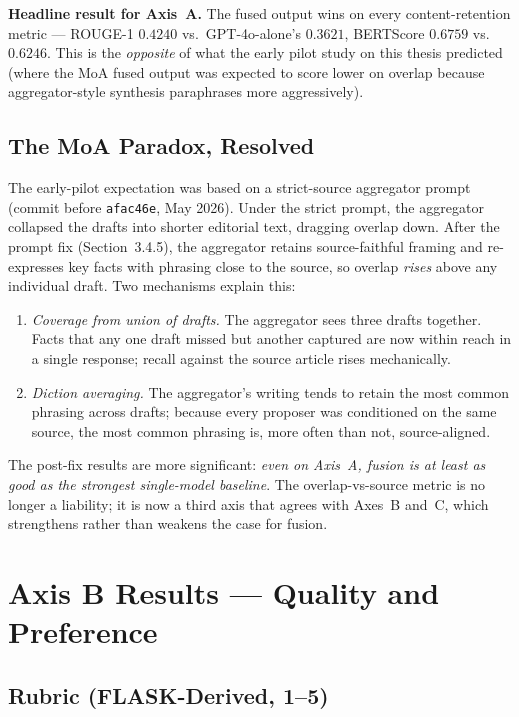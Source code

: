 \textbf{Headline result for Axis~A.} The fused output wins on every
content-retention metric --- ROUGE-1 $0.4240$ vs.\ GPT-4o-alone's $0.3621$,
BERTScore $0.6759$ vs.\ $0.6246$. This is the \textit{opposite} of what
the early pilot study on this thesis predicted (where the MoA fused
output was expected to score lower on overlap because aggregator-style
synthesis paraphrases more aggressively).

\subsection{The MoA Paradox, Resolved}

The early-pilot expectation was based on a strict-source aggregator
prompt (commit before \texttt{afac46e}, May 2026). Under the strict
prompt, the aggregator collapsed the drafts into shorter editorial
text, dragging overlap down. After the prompt fix
(Section~3.4.5), the aggregator retains source-faithful framing and
re-expresses key facts with phrasing close to the source, so overlap
\textit{rises} above any individual draft. Two mechanisms explain this:

\begin{enumerate}
  \item \textit{Coverage from union of drafts.} The aggregator sees
        three drafts together. Facts that any one draft missed but
        another captured are now within reach in a single response;
        recall against the source article rises mechanically.
  \item \textit{Diction averaging.} The aggregator's writing tends to
        retain the most common phrasing across drafts; because every
        proposer was conditioned on the same source, the most common
        phrasing is, more often than not, source-aligned.
\end{enumerate}

The post-fix results are more significant:
\textit{even on Axis~A, fusion is at least as good as the strongest
single-model baseline}. The overlap-vs-source metric is no longer a
liability; it is now a third axis that agrees with Axes~B and~C, which
strengthens rather than weakens the case for fusion.

\section{Axis B Results --- Quality and Preference}

\subsection{Rubric (FLASK-Derived, 1--5)}

